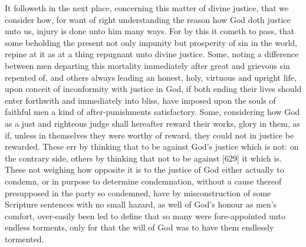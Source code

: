 It followeth in the next place, concerning this matter of divine justice, that we consider how, for want of right understanding the reason how God doth justice unto us, injury is done unto him many ways. For by this it cometh to pass, that some beholding the present not only impunity but prosperity of sin in the world, repine at it as at a thing repugnant unto divine justice. Some, noting a difference between men departing this mortality immediately after great and grievous sin repented of, and others always leading an honest, holy, virtuous and upright life, upon conceit of inconformity with justice in God, if both ending their lives should enter forthwith and immediately into bliss, have imposed upon the souls of faithful men a kind of after-punishments satisfactory. Some, considering how God as a just and righteous judge shall hereafter reward their works, glory in them, as if, unless in themselves they were worthy of reward, they could not in justice be rewarded. These err by thinking that to be against God’s justice which is not: on the contrary side, others by thinking that not to be against [629] it which is. These not weighing how opposite it is to the justice of God either actually to condemn, or in purpose to determine condemnation, without a cause thereof presupposed in the party so condemned, have by misconstruction of some Scripture sentences with no small hazard, as well of God’s honour as men’s comfort, over-easily been led to define that so many were fore-appointed unto endless torments, only for that the will of God was to have them endlessly tormented.

